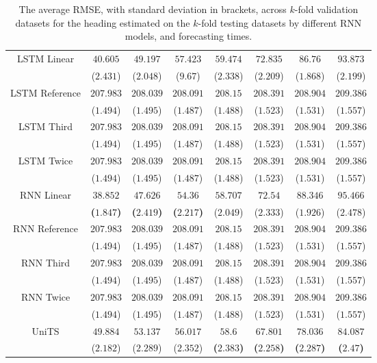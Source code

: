 \begin{table}[!ht]
{\begin{tabular}{|c|c|c|c|c|c|c|c|}
			\multirow{2}{*}{LSTM Linear} & $40.605$ & $49.197$ & $57.423$ & $59.474$ & $72.835$ & $86.76$ & $93.873$ \\
			 & ($2.431$) & ($2.048$) & ($9.67$) & ($2.338$) & ($2.209$) & ($1.868$) & ($2.199$) \\ \hline
			\multirow{2}{*}{LSTM Reference} & $207.983$ & $208.039$ & $208.091$ & $208.15$ & $208.391$ & $208.904$ & $209.386$ \\
			 & ($1.494$) & ($1.495$) & ($1.487$) & ($1.488$) & ($1.523$) & ($1.531$) & ($1.557$) \\ \hline
			\multirow{2}{*}{LSTM Third} & $207.983$ & $208.039$ & $208.091$ & $208.15$ & $208.391$ & $208.904$ & $209.386$ \\
			 & ($1.494$) & ($1.495$) & ($1.487$) & ($1.488$) & ($1.523$) & ($1.531$) & ($1.557$) \\ \hline
			\multirow{2}{*}{LSTM Twice} & $207.983$ & $208.039$ & $208.091$ & $208.15$ & $208.391$ & $208.904$ & $209.386$ \\
			 & ($1.494$) & ($1.495$) & ($1.487$) & ($1.488$) & ($1.523$) & ($1.531$) & ($1.557$) \\ \hline
			\multirow{2}{*}{RNN Linear} & $\mathbf{38.852}$ & $\mathbf{47.626}$ & $\mathbf{54.36}$ & $58.707$ & $72.54$ & $88.346$ & $95.466$ \\
			 & \textbf{(}$\mathbf{1.847}$\textbf{)} & \textbf{(}$\mathbf{2.419}$\textbf{)} & \textbf{(}$\mathbf{2.217}$\textbf{)} & ($2.049$) & ($2.333$) & ($1.926$) & ($2.478$) \\ \hline
			\multirow{2}{*}{RNN Reference} & $207.983$ & $208.039$ & $208.091$ & $208.15$ & $208.391$ & $208.904$ & $209.386$ \\
			 & ($1.494$) & ($1.495$) & ($1.487$) & ($1.488$) & ($1.523$) & ($1.531$) & ($1.557$) \\ \hline
			\multirow{2}{*}{RNN Third} & $207.983$ & $208.039$ & $208.091$ & $208.15$ & $208.391$ & $208.904$ & $209.386$ \\
			 & ($1.494$) & ($1.495$) & ($1.487$) & ($1.488$) & ($1.523$) & ($1.531$) & ($1.557$) \\ \hline
			\multirow{2}{*}{RNN Twice} & $207.983$ & $208.039$ & $208.091$ & $208.15$ & $208.391$ & $208.904$ & $209.386$ \\
			 & ($1.494$) & ($1.495$) & ($1.487$) & ($1.488$) & ($1.523$) & ($1.531$) & ($1.557$) \\ \hline
			\multirow{2}{*}{UniTS} & $49.884$ & $53.137$ & $56.017$ & $\mathbf{58.6}$ & $\mathbf{67.801}$ & $\mathbf{78.036}$ & $\mathbf{84.087}$ \\
			 & ($2.182$) & ($2.289$) & ($2.352$) & \textbf{(}$\mathbf{2.383}$\textbf{)} & \textbf{(}$\mathbf{2.258}$\textbf{)} & \textbf{(}$\mathbf{2.287}$\textbf{)} & \textbf{(}$\mathbf{2.47}$\textbf{)} \\ \hline
		\end{tabular}
	}
	\caption{The average RMSE, with standard deviation in brackets, across $k$-fold validation datasets for the heading estimated on the $k$-fold testing datasets by different RNN models, and forecasting times.}
	\label{tab:all_direction_RMSE}
\end{table}